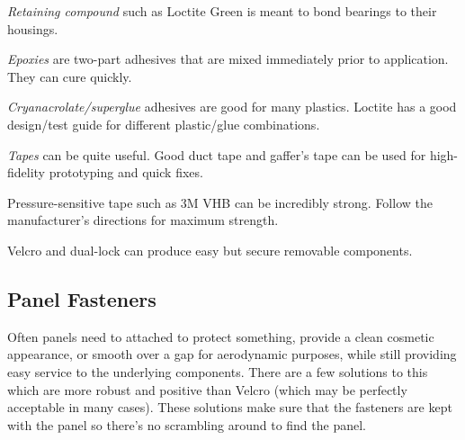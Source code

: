 \documentclass[10pt,letterpaper]{book}
\begin{document}
	\begin{asparaenum}[a)]
		\item \textit{Retaining compound} such as Loctite Green is meant to bond bearings to their housings.
		\item \textit{Epoxies} are two-part adhesives that are mixed immediately prior to application. They can cure quickly.
		\item \textit{Cryanacrolate/superglue} adhesives are good for many plastics. Loctite has a good design/test guide for different plastic/glue combinations.
		\item \textit{Tapes} can be quite useful. Good duct tape and gaffer's tape can be used for high-fidelity prototyping and quick fixes.
		\item Pressure-sensitive tape such as 3M VHB can be incredibly strong. Follow the manufacturer's directions for maximum strength.
		\item Velcro and dual-lock can produce easy but secure removable components.
	\end{asparaenum}
	
	
	\subsection{Panel Fasteners}
	
	Often panels need to attached to protect something, provide a clean cosmetic appearance, or smooth over a gap for aerodynamic purposes, while still providing easy service to the underlying components. There are a few solutions to this which are more robust and positive than Velcro (which may be perfectly acceptable in many cases). These solutions make sure that the fasteners are kept with the panel so there's no scrambling around to find the panel.
	
\end{document}
